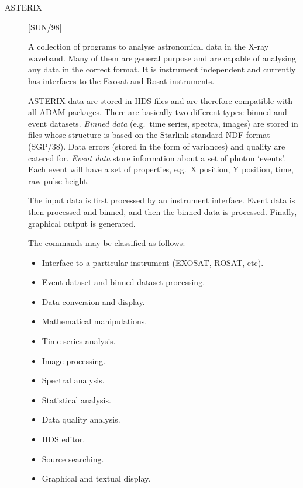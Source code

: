 \begin{description}

\item [ASTERIX] \hfill [SUN/98]

A collection of programs to analyse astronomical data in the X-ray waveband.
Many of them are general purpose and are capable of analysing any data in the
correct format.
It is instrument independent and currently has interfaces to the Exosat and
Rosat instruments. 

ASTERIX data are stored in HDS files and are therefore compatible with all ADAM
packages.
There are basically two different types: binned and event datasets.
{\em Binned data} (e.g.\ time series, spectra, images) are stored in files whose
structure is based on the Starlink standard NDF format (SGP/38). 
Data errors (stored in the form of variances) and quality are catered for.
{\em Event data} store information about a set of photon `events'.
Each event will have a set of properties, e.g.\ X position, Y position, time,
raw pulse height.

The input data is first processed by an instrument interface.
Event data is then processed and binned, and then the binned data is
processed.
Finally, graphical output is generated.

The commands may be classified as follows:

\begin{itemize}
\item Interface to a particular instrument (EXOSAT, ROSAT, etc).
\item Event dataset and binned dataset processing.
\item Data conversion and display.
\item Mathematical manipulations.
\item Time series analysis.
\item Image processing.
\item Spectral analysis.
\item Statistical analysis.
\item Data quality analysis.
\item HDS editor.
\item Source searching.
\item Graphical and textual display.
\end{itemize}

\end{description}

\newpage

